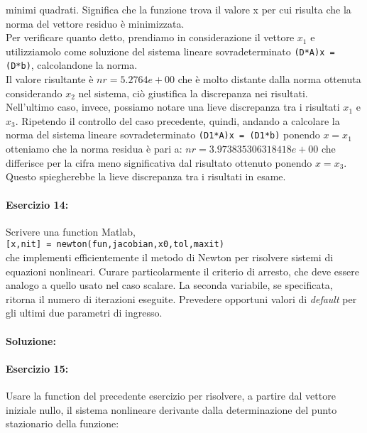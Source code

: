 \documentclass[12pt]{article}
\begin{document}
minimi quadrati. Significa che la funzione trova il valore x per cui risulta che la norma del vettore residuo è minimizzata. \\
Per verificare quanto detto, prendiamo in considerazione il vettore \(x_1\) e utilizziamolo come soluzione del sistema lineare sovradeterminato
\texttt{(D*A)x = (D*b)}, calcolandone la norma. \\
Il valore risultante è \(nr = 5.2764e+00\) che è molto distante dalla norma ottenuta considerando \(x_2\) nel sistema, ciò giustifica la discrepanza nei risultati. \\
Nell'ultimo caso, invece, possiamo notare una lieve discrepanza tra i risultati \(x_1\) e \(x_3\). 
Ripetendo il controllo del caso precedente, quindi, andando a calcolare la norma del sistema lineare sovradeterminato \texttt{(D1*A)x = (D1*b)} 
ponendo \(x = x_1\) otteniamo che la norma residua è pari a: \(nr=3.973835306318418e+00\) che differisce per la cifra meno significativa dal risultato
ottenuto ponendo \(x = x_3\). Questo spiegherebbe la lieve discrepanza tra i risultati in esame.




\paragraph{Esercizio 14:}Scrivere una function Matlab,\\
\texttt{[x,nit] = newton(fun,jacobian,x0,tol,maxit)}\\
che implementi efficientemente il metodo di Newton per risolvere sistemi di equazioni nonlineari. 
Curare particolarmente il criterio di arresto, che deve essere analogo a quello usato nel caso scalare. 
La seconda variabile, se specificata, ritorna il numero di iterazioni eseguite. Prevedere opportuni valori 
di \textit{default} per gli ultimi due parametri di ingresso.
\paragraph{Soluzione:}

\paragraph{Esercizio 15:} Usare la function del precedente esercizio per risolvere, a partire dal vettore iniziale nullo, 
il sistema nonlineare derivante dalla determinazione del punto stazionario della funzione:
\end{document}
